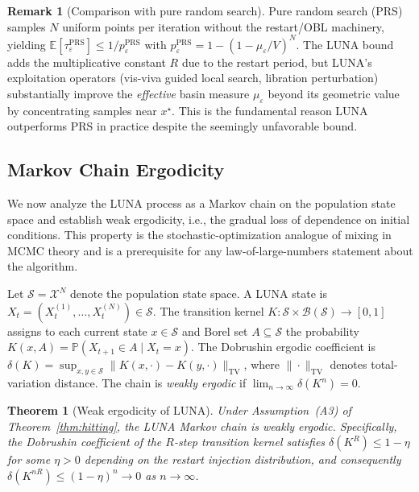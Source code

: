 \documentclass[review]{elsarticle}
\newtheorem{theorem}{Theorem}
\theoremstyle{definition}
\newtheorem{remark}{Remark}
\begin{document}
\begin{remark}[Comparison with pure random search]
Pure random search (PRS) samples $N$ uniform points per iteration without the restart/OBL machinery, yielding $\mathbb{E}[\tau_\varepsilon^{\mathrm{PRS}}]\le 1/p_\varepsilon^{\mathrm{PRS}}$ with $p_\varepsilon^{\mathrm{PRS}}=1-(1-\mu_\varepsilon/V)^N$. The LUNA bound adds the multiplicative constant $R$ due to the restart period, but LUNA's exploitation operators (vis-viva guided local search, libration perturbation) substantially improve the \emph{effective} basin measure $\mu_\varepsilon$ beyond its geometric value by concentrating samples near $x^\star$. This is the fundamental reason LUNA outperforms PRS in practice despite the seemingly unfavorable bound.
\end{remark}

\subsection{Markov Chain Ergodicity}
\label{sec:markov}

We now analyze the LUNA process as a Markov chain on the population state space and establish weak ergodicity, i.e., the gradual loss of dependence on initial conditions. This property is the stochastic-optimization analogue of mixing in MCMC theory and is a prerequisite for any law-of-large-numbers statement about the algorithm.

Let $\mathcal{S}=\mathcal{X}^N$ denote the population state space. A LUNA state is $X_t=(X_t^{(1)},\dots,X_t^{(N)})\in\mathcal{S}$. The transition kernel $K:\mathcal{S}\times\mathcal{B}(\mathcal{S})\to[0,1]$ assigns to each current state $x\in\mathcal{S}$ and Borel set $A\subseteq\mathcal{S}$ the probability $K(x,A)=\mathbb{P}(X_{t+1}\in A\mid X_t=x)$. The Dobrushin ergodic coefficient is $\delta(K)=\sup_{x,y\in\mathcal{S}}\|K(x,\cdot)-K(y,\cdot)\|_{\mathrm{TV}}$, where $\|\cdot\|_{\mathrm{TV}}$ denotes total-variation distance. The chain is \emph{weakly ergodic} if $\lim_{n\to\infty}\delta(K^n)=0$.

\begin{theorem}[Weak ergodicity of LUNA]
\label{thm:ergodic}
Under Assumption~(A3) of Theorem~\ref{thm:hitting}, the LUNA Markov chain is weakly ergodic. Specifically, the Dobrushin coefficient of the $R$-step transition kernel satisfies $\delta(K^R)\le 1-\eta$ for some $\eta>0$ depending on the restart injection distribution, and consequently $\delta(K^{nR})\le(1-\eta)^n\to 0$ as $n\to\infty$.
\end{theorem}
\end{document}
